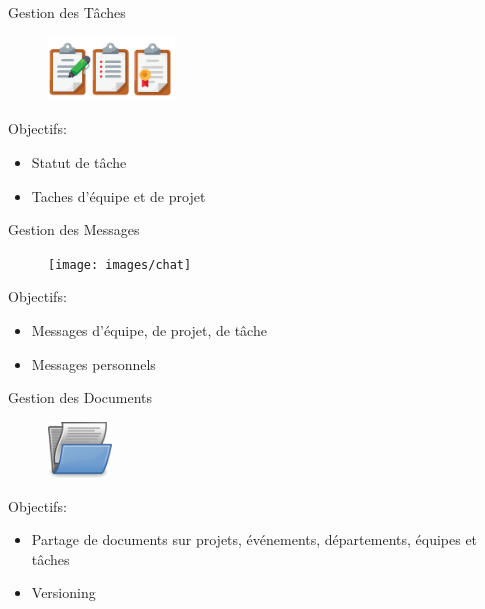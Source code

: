 \begin{frame}{Gestion des Tâches}
\begin{figure}[h!]
  \includegraphics[width=0.3\textwidth]{images/tasks}
\end{figure}
Objectifs:
  \begin{itemize}
    \item Statut de tâche
    \item Taches d'équipe et de projet
  \end{itemize}
\end{frame}

\begin{frame}{Gestion des Messages}
\begin{figure}[h!]
  \texttt{[image: images/chat]}
\end{figure}
Objectifs:
  \begin{itemize}
    \item Messages d'équipe, de projet, de tâche
    \item Messages personnels
  \end{itemize}
\end{frame}

\begin{frame}{Gestion des Documents}
\begin{figure}[h!]
  \includegraphics[width=0.15\textwidth]{images/document-open-hi}
\end{figure}
Objectifs:
  \begin{itemize}
    \item Partage de documents sur projets, événements, départements, équipes et tâches
    \item Versioning
  \end{itemize}
\end{frame}



